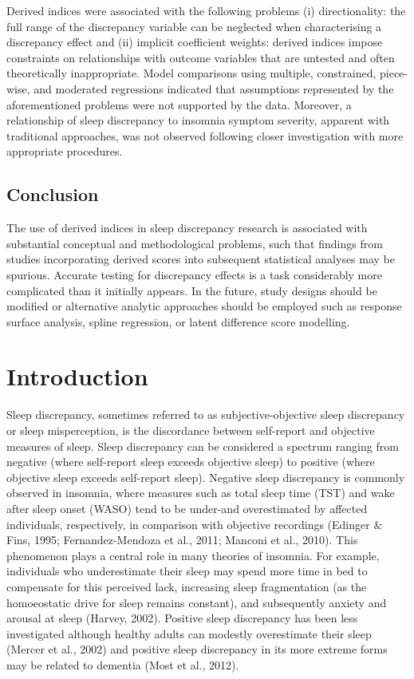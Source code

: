 \documentclass[
]{article}
\begin{document}
Derived indices were associated with the following problems (i) directionality: the full range of the discrepancy variable can be neglected when characterising a discrepancy effect and (ii) implicit coefficient weights: derived indices impose constraints on relationships with outcome variables that are untested and often theoretically inappropriate. Model comparisons using multiple, constrained, piece-wise, and moderated regressions indicated that assumptions represented by the aforementioned problems were not supported by the data. Moreover, a relationship of sleep discrepancy to insomnia symptom severity, apparent with traditional approaches, was not observed following closer investigation with more appropriate procedures.

\subsection{Conclusion}\label{conclusion}

The use of derived indices in sleep discrepancy research is associated with substantial conceptual and methodological problems, such that findings from studies incorporating derived scores into subsequent statistical analyses may be spurious. Accurate testing for discrepancy effects is a task considerably more complicated than it initially appears. In the future, study designs should be modified or alternative analytic approaches should be employed such as response surface analysis, spline regression, or latent difference score modelling.

\section{Introduction}\label{introduction-1}

Sleep discrepancy, sometimes referred to as subjective-objective sleep discrepancy or sleep misperception, is the discordance between self-report and objective measures of sleep. Sleep discrepancy can be considered a spectrum ranging from negative (where self-report sleep exceeds objective sleep) to positive (where objective sleep exceeds self-report sleep). Negative sleep discrepancy is commonly observed in insomnia, where measures such as total sleep time (TST) and wake after sleep onset (WASO) tend to be under-and overestimated by affected individuals, respectively, in comparison with objective recordings (Edinger \& Fins, 1995; Fernandez-Mendoza et al., 2011; Manconi et al., 2010). This phenomenon plays a central role in many theories of insomnia. For example, individuals who underestimate their sleep may spend more time in bed to compensate for this perceived lack, increasing sleep fragmentation (as the homoeostatic drive for sleep remains constant), and subsequently anxiety and arousal at sleep (Harvey, 2002). Positive sleep discrepancy has been less investigated although healthy adults can modestly overestimate their sleep (Mercer et al., 2002) and positive sleep discrepancy in its more extreme forms may be related to dementia (Most et al., 2012).
\end{document}
